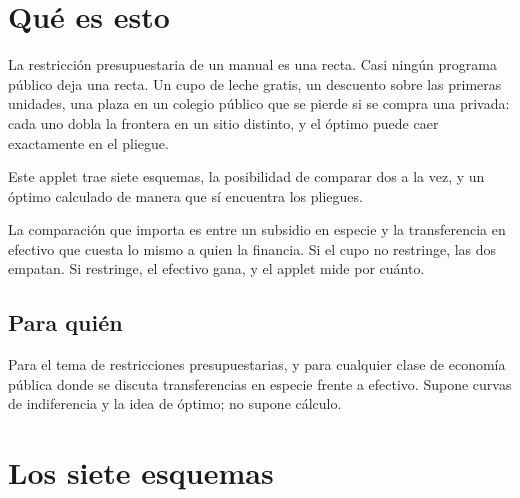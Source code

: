 \documentclass[11pt,a4paper]{appletmanual}
\begin{document}

\manualtoc
\thispagestyle{empty}
\clearpage
\setcounter{page}{1}

\section{Qué es esto}

La restricción presupuestaria de un manual es una recta. Casi ningún programa
público deja una recta. Un cupo de leche gratis, un descuento sobre las
primeras unidades, una plaza en un colegio público que se pierde si se compra
una privada: cada uno dobla la frontera en un sitio distinto, y el óptimo puede
caer exactamente en el pliegue.

Este applet trae siete esquemas, la posibilidad de comparar dos a la vez, y un
óptimo calculado de manera que sí encuentra los pliegues.


\begin{amkey}
La comparación que importa es entre un subsidio en especie y la transferencia
en efectivo que cuesta lo mismo a quien la financia. Si el cupo no restringe,
las dos empatan. Si restringe, el efectivo gana, y el applet mide por cuánto.
\end{amkey}

\subsection{Para quién}

Para el tema de restricciones presupuestarias, y para cualquier clase de
economía pública donde se discuta transferencias en especie frente a efectivo.
Supone curvas de indiferencia y la idea de óptimo; no supone cálculo.



\section{Los siete esquemas}
\end{document}
